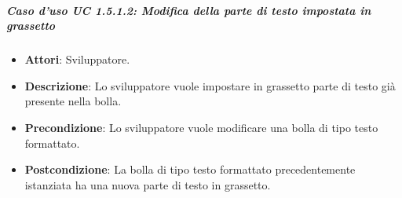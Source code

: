 \subparagraph{Caso d'uso UC 1.5.1.2: Modifica della parte di testo impostata in grassetto}


\FloatBarrier
\begin{itemize}
\item\textbf{Attori}: Sviluppatore.
\item\textbf{Descrizione}: Lo sviluppatore vuole impostare in grassetto parte di testo già presente nella bolla.
\item\textbf{Precondizione}: Lo sviluppatore vuole modificare una bolla di tipo testo formattato.
\item\textbf{Postcondizione}: La bolla di tipo testo formattato precedentemente istanziata ha una nuova parte di testo in grassetto.

\end{itemize}

